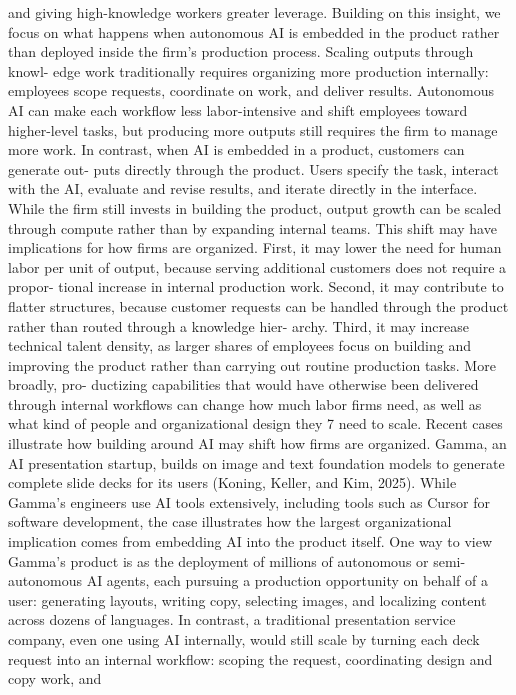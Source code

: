 and giving high-knowledge workers greater leverage.
Building on this insight, we focus on what happens when autonomous AI is embedded in the
product rather than deployed inside the firm’s production process. Scaling outputs through knowl-
edge work traditionally requires organizing more production internally: employees scope requests,
coordinate on work, and deliver results. Autonomous AI can make each workflow less labor-intensive
and shift employees toward higher-level tasks, but producing more outputs still requires the firm to
manage more work. In contrast, when AI is embedded in a product, customers can generate out-
puts directly through the product. Users specify the task, interact with the AI, evaluate and revise
results, and iterate directly in the interface. While the firm still invests in building the product,
output growth can be scaled through compute rather than by expanding internal teams.
This shift may have implications for how firms are organized. First, it may lower the need for
human labor per unit of output, because serving additional customers does not require a propor-
tional increase in internal production work. Second, it may contribute to flatter structures, because
customer requests can be handled through the product rather than routed through a knowledge hier-
archy. Third, it may increase technical talent density, as larger shares of employees focus on building
and improving the product rather than carrying out routine production tasks. More broadly, pro-
ductizing capabilities that would have otherwise been delivered through internal workflows can
change how much labor firms need, as well as what kind of people and organizational design they
7
need to scale.
Recent cases illustrate how building around AI may shift how firms are organized. Gamma,
an AI presentation startup, builds on image and text foundation models to generate complete
slide decks for its users (Koning, Keller, and Kim, 2025). While Gamma’s engineers use AI tools
extensively, including tools such as Cursor for software development, the case illustrates how the
largest organizational implication comes from embedding AI into the product itself. One way to
view Gamma’s product is as the deployment of millions of autonomous or semi-autonomous AI
agents, each pursuing a production opportunity on behalf of a user: generating layouts, writing
copy, selecting images, and localizing content across dozens of languages. In contrast, a traditional
presentation service company, even one using AI internally, would still scale by turning each deck
request into an internal workflow: scoping the request, coordinating design and copy work, and

